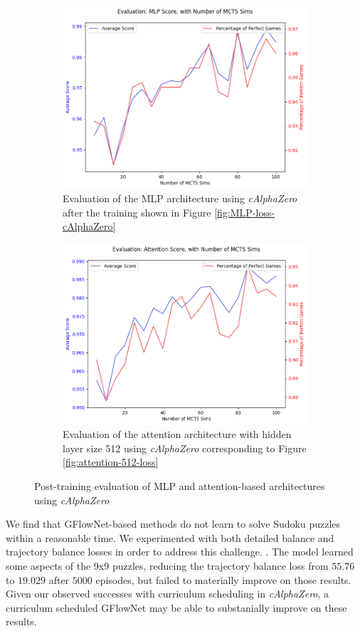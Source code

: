 \documentclass[10pt, reqno, letterpaper, twoside]{amsart}
\begin{document}
\begin{figure}
    \centering
    \begin{subfigure}{0.45\textwidth}
        \includegraphics[width=0.8\linewidth]{images/eval_mlp.png}
        \caption{Evaluation of the MLP architecture using \textit{cAlphaZero} after the training shown in Figure \ref{fig:MLP-loss-cAlphaZero}}
    \end{subfigure}
    \hfill
    \begin{subfigure}{0.45\textwidth}
        \includegraphics[width=0.8\linewidth]{images/eval_attention.png}
        \caption{Evaluation of the attention architecture with hidden layer size 512 using \textit{cAlphaZero} corresponding to Figure \ref{fig:attention-512-loss}}
    \end{subfigure}
    \caption{Post-training evaluation of MLP and attention-based architectures using \textit{cAlphaZero}}
    \label{fig:MLP-loss}
\end{figure}


We find that GFlowNet-based methods do not learn to solve Sudoku puzzles within a reasonable time.   We experimented with both detailed balance and trajectory balance losses in order to address this challenge. \cite{https://doi.org/10.15488/13422}.  The model learned some aspects of the 9x9 puzzles, reducing the trajectory balance loss from $55.76$ to $19.029$ after $5000$ episodes, but failed to materially improve on those results.  Given our observed successes with curriculum scheduling in \textit{cAlphaZero}, a curriculum scheduled GFlowNet may be able to substanially improve on these results.
\end{document}
